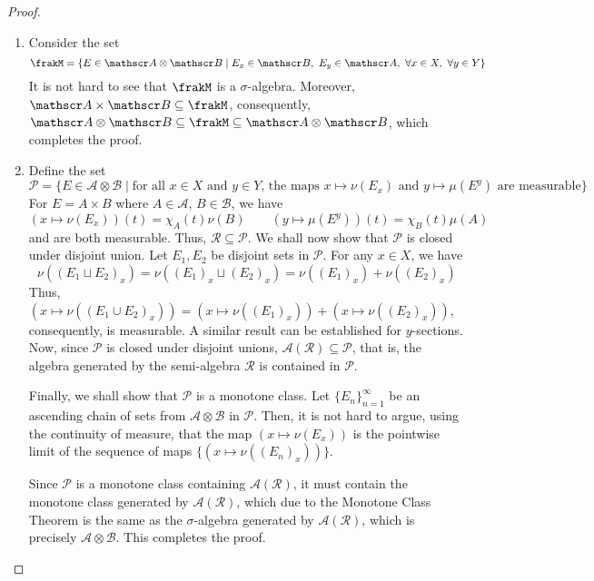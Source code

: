 \begin{proof}
\begin{enumerate}[label=(\alph*)]
\item Consider the set 
\begin{equation*}
    \frakM = \{E\in\mathscr A\otimes\mathscr B\mid E_x\in\mathscr B,~E_y\in\mathscr A,~\forall x\in X,~\forall y\in Y\}
\end{equation*}
It is not hard to see that $\frakM$ is a $\sigma$-algebra. Moreover, $\mathscr A\times\mathscr B\subseteq\frakM$, consequently, $\mathscr A\otimes\mathscr B\subseteq\frakM\subseteq\mathscr A\otimes\mathscr B$, which completes the proof.

\item Define the set 
\begin{equation*}
    \mathcal P = \{E\in\mathscr A\otimes\mathscr B\mid\text{for all $x\in X$ and $y\in Y$, the maps $x\mapsto\nu(E_x)$ and $y\mapsto\mu(E^y)$ are measurable}\}
\end{equation*}
For $E = A\times B$ where $A\in\mathscr A$, $B\in\mathscr B$, we have 
\begin{equation*}
    (x\mapsto\nu(E_x))(t) = \chi_A(t)\nu(B)\qquad(y\mapsto\mu(E^y))(t) = \chi_B(t)\mu(A)
\end{equation*}
and are both measurable. Thus, $\mathcal R\subseteq\mathcal P$. We shall now show that $\mathcal P$ is closed under disjoint union. Let $E_1,E_2$ be disjoint sets in $\mathcal P$. For any $x\in X$, we have 
\begin{equation*}
    \nu((E_1\sqcup E_2)_x) = \nu((E_1)_x\sqcup(E_2)_x) = \nu((E_1)_x) + \nu((E_2)_x)
\end{equation*}
Thus, $(x\mapsto\nu((E_1\cup E_2)_x)) = (x\mapsto\nu((E_1)_x)) + (x\mapsto\nu((E_2)_x))$, consequently, is measurable. A similar result can be established for $y$-sections. Now, since $\mathcal P$ is closed under disjoint unions, $\mathcal A(\mathcal R)\subseteq\mathcal P$, that is, the algebra generated by the semi-algebra $\mathcal R$ is contained in $\mathcal P$.

Finally, we shall show that $\mathcal P$ is a monotone class. Let $\{E_n\}_{n = 1}^\infty$ be an ascending chain of sets from $\mathscr A\otimes\mathscr B$ in $\mathcal P$. Then, it is not hard to argue, using the continuity of measure, that the map $(x\mapsto\nu(E_x))$ is the pointwise limit of the sequence of maps $\{(x\mapsto\nu((E_n)_x))\}$.

Since $\mathcal P$ is a monotone class containing $\mathcal A(\mathcal R)$, it must contain the monotone class generated by $\mathcal A(\mathcal R)$, which due to the Monotone Class Theorem is the same as the $\sigma$-algebra generated by $\mathcal A(\mathcal R)$, which is precisely $\mathscr A\otimes\mathscr B$. This completes the proof.


\end{enumerate}
\end{proof}
